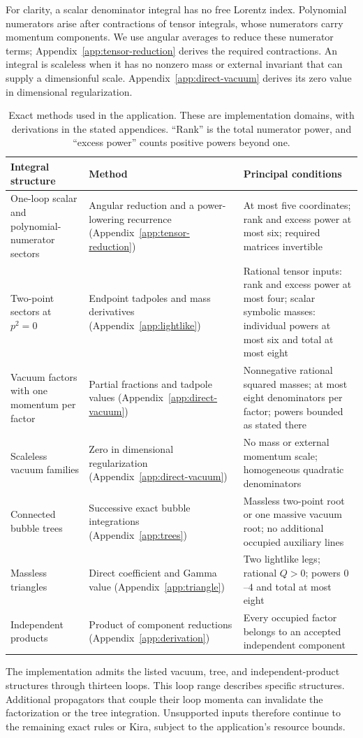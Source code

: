 For clarity, a scalar denominator integral has no free Lorentz index. Polynomial numerators arise after contractions of tensor integrals, whose numerators carry momentum components. We use angular averages to reduce these numerator terms; Appendix~\ref{app:tensor-reduction} derives the required contractions. An integral is scaleless when it has no nonzero mass or external invariant that can supply a dimensionful scale. Appendix~\ref{app:direct-vacuum} derives its zero value in dimensional regularization.
\begin{table}[!htbp]\centering\small
\caption{Exact methods used in the application. These are implementation domains, with derivations in the stated appendices. ``Rank'' is the total numerator power, and ``excess power'' counts positive powers beyond one.}
\label{tab:exact-domains}
\begin{tabularx}{\linewidth}{@{}YYY@{}}\toprule
Integral structure & Method & Principal conditions\\\midrule
One-loop scalar and polynomial-numerator sectors & Angular reduction and a power-lowering recurrence (Appendix~\ref{app:tensor-reduction}) & At most five coordinates; rank and excess power at most six; required matrices invertible\\
Two-point sectors at $p^2=0$ & Endpoint tadpoles and mass derivatives (Appendix~\ref{app:lightlike}) & Rational tensor inputs: rank and excess power at most four; scalar symbolic masses: individual powers at most six and total at most eight\\
Vacuum factors with one momentum per factor & Partial fractions and tadpole values (Appendix~\ref{app:direct-vacuum}) & Nonnegative rational squared masses; at most eight denominators per factor; powers bounded as stated there\\
Scaleless vacuum families & Zero in dimensional regularization (Appendix~\ref{app:direct-vacuum}) & No mass or external momentum scale; homogeneous quadratic denominators\\
Connected bubble trees & Successive exact bubble integrations (Appendix~\ref{app:trees}) & Massless two-point root or one massive vacuum root; no additional occupied auxiliary lines\\
Massless triangles & Direct coefficient and Gamma value (Appendix~\ref{app:triangle}) & Two lightlike legs; rational $Q>0$; powers $0$--$4$ and total at most eight\\
Independent products & Product of component reductions (Appendix~\ref{app:derivation}) & Every occupied factor belongs to an accepted independent component\\\bottomrule
\end{tabularx}
\end{table}
The implementation admits the listed vacuum, tree, and independent-product structures through thirteen loops. This loop range describes specific structures. Additional propagators that couple their loop momenta can invalidate the factorization or the tree integration. Unsupported inputs therefore continue to the remaining exact rules or Kira, subject to the application's resource bounds.

